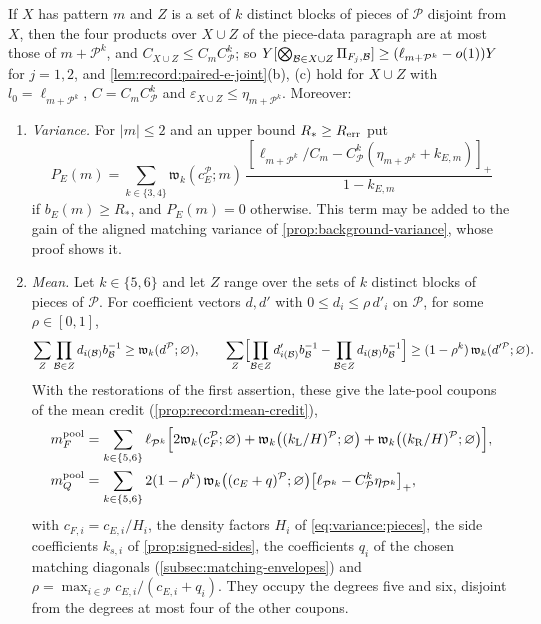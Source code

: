 \begin{lemma}\label{lem:pool-coupons}
If $X$ has pattern $m$ and $Z$ is a set of $k$ distinct blocks of pieces of
$\mathcal P$ disjoint from $X$, then the four products over $X\cup Z$ of the
piece-data paragraph are at most those of $m+\mathcal P^k$, and
$C_{X\cup Z}\le C_mC_{\mathcal P}^k$; so
$Y[\bigotimes_{\mathcal B\in X\cup Z}\Pi_{F_j,\mathcal B}]\ge(\ell_{m+\mathcal P^k}-o(1))Y$ for
$j=1,2$, and \cref{lem:record:paired-e-joint}(b), (c) hold for $X\cup Z$ with
$l_0=\ell_{m+\mathcal P^k}$, $C=C_mC_{\mathcal P}^k$ and
$\varepsilon_{X\cup Z}\le\eta_{m+\mathcal P^k}$. Moreover:
\begin{enumerate}[label=(\alph*)]
\item \emph{Variance.} For $|m|\le2$ and an upper bound $R_*\ge R_{\rm err}$ put
 \[
  P_E(m)=\sum_{k\in\{3,4\}}\mathfrak w_k(c_E^{\mathcal P};m)\,
  \frac{[\ell_{m+\mathcal P^k}/C_m-C_{\mathcal P}^k(\eta_{m+\mathcal P^k}+k_{E,m})]_+}
  {1-k_{E,m}}
 \]
 if $b_E(m)\ge R_*$, and $P_E(m)=0$ otherwise. This term may be added to the gain
 of the aligned matching variance of \cref{prop:background-variance}, whose proof
 shows it.
\item \emph{Mean.} Let $k\in\{5,6\}$ and let $Z$ range over the sets of $k$
 distinct blocks of pieces of $\mathcal P$. For coefficient vectors $d,d'$ with
 $0\le d_i\le\rho\,d'_i$ on $\mathcal P$, for some $\rho\in[0,1]$,
 \[
  \sum_Z\prod_{\mathcal B\in Z}d_{i(\mathcal B)}b_\mathcal B^{-1}\ge\mathfrak w_k(d^{\mathcal P};\varnothing),
  \qquad
  \sum_Z\Bigl[\prod_{\mathcal B\in Z}d'_{i(\mathcal B)}b_\mathcal B^{-1}-\prod_{\mathcal B\in Z}
  d_{i(\mathcal B)}b_\mathcal B^{-1}\Bigr]\ge(1-\rho^k)\,\mathfrak w_k(d'^{\mathcal P};\varnothing).
 \]
 With the restorations of the first assertion, these give the late-pool
 coupons of the mean credit (\cref{prop:record:mean-credit}),
 \begin{align*}
  m^{\rm pool}_F&=\sum_{k\in\{5,6\}}\ell_{\mathcal P^k}\Bigl[2\mathfrak w_k(c_F^{\mathcal P};\varnothing)
  +\mathfrak w_k\bigl((k_{\rm L}/H)^{\mathcal P};\varnothing\bigr)
  +\mathfrak w_k\bigl((k_{\rm R}/H)^{\mathcal P};\varnothing\bigr)\Bigr],\\
  m^{\rm pool}_Q&=\sum_{k\in\{5,6\}}2(1-\rho^k)\,
  \mathfrak w_k\bigl((c_E+q)^{\mathcal P};\varnothing\bigr)
  \bigl[\ell_{\mathcal P^k}-C_{\mathcal P}^k\eta_{\mathcal P^k}\bigr]_+,
 \end{align*}
 with $c_{F,i}=c_{E,i}/H_i$, the density factors $H_i$ of
 \eqref{eq:variance:pieces}, the side coefficients $k_{s,i}$ of
 \cref{prop:signed-sides}, the coefficients $q_i$ of the chosen matching
 diagonals (\cref{subsec:matching-envelopes}) and
 $\rho=\max_{i\in\mathcal P}c_{E,i}/(c_{E,i}+q_i)$. They occupy the degrees five
 and six, disjoint from the degrees at most four of the other coupons.
\end{enumerate}
\end{lemma}

